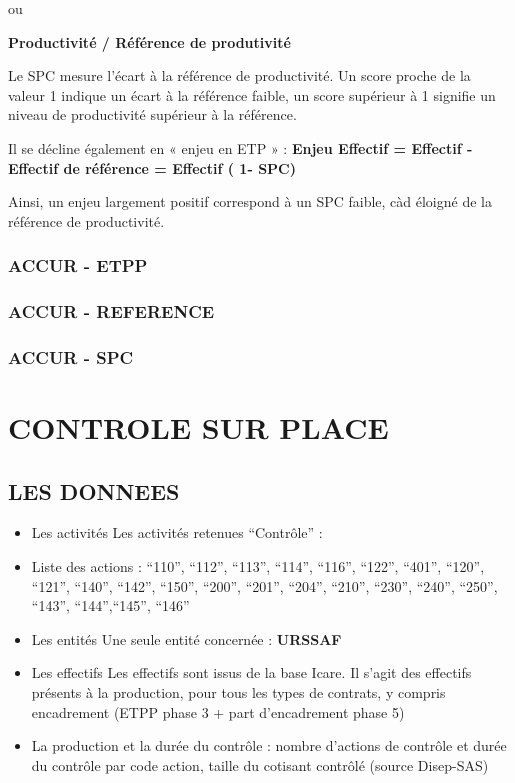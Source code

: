 \documentclass[
]{book}
\begin{document}
ou

\textbf{Productivité / Référence de produtivité}

Le SPC mesure l'écart à la référence de productivité. Un score proche de la valeur 1 indique un écart à la référence faible, un score supérieur à 1 signifie un niveau de productivité supérieur à la référence.

Il se décline également en « enjeu en ETP » :
\textbf{Enjeu Effectif = Effectif - Effectif de référence = Effectif ( 1- SPC)}

Ainsi, un enjeu largement positif correspond à un SPC faible, càd éloigné de la référence de productivité.

\hypertarget{accur---etpp}{%
\subsection{ACCUR - ETPP}\label{accur---etpp}}

\hypertarget{accur---reference}{%
\subsection{ACCUR - REFERENCE}\label{accur---reference}}

\hypertarget{accur---spc}{%
\subsection{ACCUR - SPC}\label{accur---spc}}

\hypertarget{controle-sur-place}{%
\chapter{CONTROLE SUR PLACE}\label{controle-sur-place}}

\hypertarget{les-donnees-1}{%
\section{LES DONNEES}\label{les-donnees-1}}

\begin{itemize}
\item
  Les activités
  Les activités retenues ``Contrôle'' :
\item
  Liste des actions : ``110'', ``112'', ``113'', ``114'', ``116'', ``122'', ``401'', ``120'', ``121'', ``140'', ``142'', ``150'', ``200'', ``201'', ``204'', ``210'', ``230'', ``240'', ``250'', ``143'', ``144'',``145'', ``146''
\item
  Les entités
  Une seule entité concernée : \textbf{URSSAF}
\item
  Les effectifs
  Les effectifs sont issus de la base Icare.
  Il s'agit des effectifs présents à la production, pour tous les types de contrats, y compris encadrement (ETPP phase 3 + part d'encadrement phase 5)
\item
  La production et la durée du contrôle : nombre d'actions de contrôle et durée du contrôle par code action, taille du cotisant contrôlé (source Disep-SAS)
\end{itemize}
\end{document}
